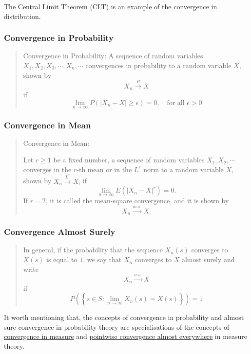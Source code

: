 \documentclass[
  letterpaper,
  DIV=11,
  numbers=noendperiod]{scrreprt}
\theoremstyle{plain}
\theoremstyle{remark}
\begin{document}
The Central Limit Theorem (CLT) is an example of the convergence in
distribution.

\hypertarget{convergence-in-probability}{%
\subsubsection{Convergence in
Probability}\label{convergence-in-probability}}

\begin{quote}
Convergence in Probability: A sequence of random variables
\(X_1,X_2,X_3,\cdots, X_n,\cdots\) convergences in probability to a
random variable \(X\), shown by\\
\[
X_n\xrightarrow{P}X
\] if \[
\lim_{n \rightarrow \infty}P(|X_n-X|\geq \epsilon)=0, \quad \text{for all } \epsilon >0
\]
\end{quote}

\hypertarget{convergence-in-mean}{%
\subsubsection{Convergence in Mean}\label{convergence-in-mean}}

\begin{quote}
Convergence in Mean:

Let \(r\geq 1\) be a fixed number, a sequence of random variables
\(X_1,X_2,\cdots\) converges in the \(r\)-th mean or in the \(L^r\) norm
to a random variable \(X\), shown by \(X_n \xrightarrow{L^r} X\), if \[
\lim_{n \rightarrow \infty} E(|X_n-X|^r)=0.
\] If \(r=2\), it is called the mean-square convergence, and it is shown
by \[
X_n\xrightarrow{m.s.}X.
\]
\end{quote}

\hypertarget{convergence-almost-surely}{%
\subsubsection{Convergence Almost
Surely}\label{convergence-almost-surely}}

\begin{quote}
In general, if the probability that the sequence \(X_n(s)\) converges to
\(X(s)\) is equal to \(1\), we say that \(X_n\) converges to \(X\)
almost surely and write \[
X_n \xrightarrow{a.s.} X
\] if \[
P\left(\left\{s\in S: \lim_{n\rightarrow \infty}X_n(s)=X(s)\right\}\right)=1
\]
\end{quote}

It worth mentioning that, the concepts of convergence in probability and
almost sure convergence in probability theory are specialisations of the
concepts of
\href{http://en.wikipedia.org/wiki/Convergence_in_measure}{convergence
in measure} and
\href{http://en.wikipedia.org/wiki/Pointwise_convergence\#In_measure_theory}{pointwise
convergence almost everywhere} in measure theory.
\end{document}
